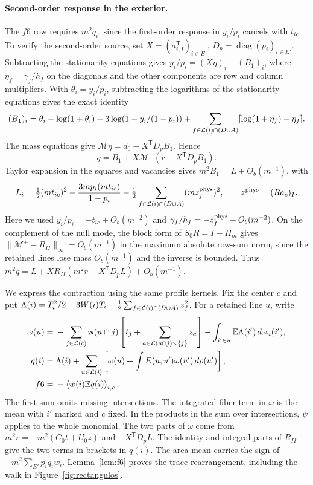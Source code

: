 \paragraph{Second-order response in the exterior.} The \(f6\) row requires \(m^2q_i\), since the
first-order response in \(y_i/p_i\) cancels with \(t_{ic}\). To verify the second-order source, set
\(X=(a_{i,I}^{\mathsf T})_{i\in E'}\), \(D_p=\operatorname{diag}(p_i)_{i\in E'}\). Subtracting the
stationarity equations gives \(y_i/p_i=(X\eta)_i+(B_1)_i\), where \(\eta_f=\gamma_f/h_f\) on the
diagonals and the other components are row and column multipliers. With \(\theta_i=y_i/p_i\), subtracting
the logarithms of the stationarity equations gives the exact identity \[
 (B_1)_i=\theta_i-\log(1+\theta_i)-3\log(1-y_i/(1-p_i))
 +\sum_{f\in \mathcal L(i)\cap(D\cup A)}[\log(1+\eta_f)-\eta_f].
\] The mass equations give \(\mathcal M\eta=d_0-X^{\mathsf T}D_pB_1\). Hence \[
 q=B_1+X\mathcal M^+(r-X^{\mathsf T}D_p B_1).
\] Taylor expansion in the squares and vacancies gives \(m^2B_1=L+O_b(m^{-1})\), with \[
 L_i=\tfrac12(mt_{ic})^2-\frac{3mp_i(mt_{ic})}{1-p_i}
       -\tfrac12\sum_{f\in \mathcal L(i)\cap(D\cup A)}(mz_f^{\rm phys})^2,\qquad
 z^{\rm phys}=(Ra_c)_I .
\] Here we used \(y_i/p_i=-t_{ic}+O_b(m^{-2})\) and \(\gamma_f/h_f=-z_f^{\rm phys}+O_b(m^{-2})\). On the
complement of the null mode, the block form of \(S_0R=I-\Pi_m\) gives \(\|\mathcal
M^+-R_{II}\|_\infty=O_b(m^{-1})\) in the maximum absolute row-sum norm, since the retained lines lose
mass \(O_b(m^{-1})\) and the inverse is bounded. Thus \(m^2q=L+XR_{II}(m^2r-X^{\mathsf
T}D_pL)+O_b(m^{-1})\).

We express the contraction using the same profile kernels. Fix the center \(c\) and put
\(\Lambda(i)=T_i^2/2-3W(i)T_i-\tfrac12\sum_{f\in \mathcal L(i)\cap(D\cup A)}z_f^2\). For a retained line
\(u\), write \begin{align*}
 \omega(u)={}&-\sum_{j\in \mathcal L(c)} \mathsf w(u\cap j)
     \left[t_j+\sum_{a\in \mathcal L(u\cap j)\smallsetminus\{j\}}z_a\right]
      -\int_{i'\in u}\mathbb E\Lambda(i')\,d\omega_u(i'),\\
 q(i)={}&\Lambda(i)+\sum_{u\in \mathcal L(i)}
 \left[\omega(u)+\int E(u,u')\omega(u')\,d\rho(u')\right],\\
 f6={}&-\left\langle w(i)\mathbb E q(i)\right\rangle_{i,c}.
\end{align*} The first sum omits missing intersections. The integrated fiber term in \(\omega\) is the
mean with \(i'\) marked and \(c\) fixed. In the products in the sum over intersections, \(\psi\) applies
to the whole monomial. The two parts of \(\omega\) come from \(m^2r=-m^2(C_0t+U_0z)\) and \(-X^{\mathsf
T}D_pL\). The identity and integral parts of \(R_{II}\) give the two terms in brackets in \(q(i)\). The
area mean carries the sign of \(-m^2\sum_{E'}p_iq_iw_i\). Lemma~\ref{lem:f6} proves the trace
rearrangement, including the walk in Figure~\ref{fig:rectangulos}.
